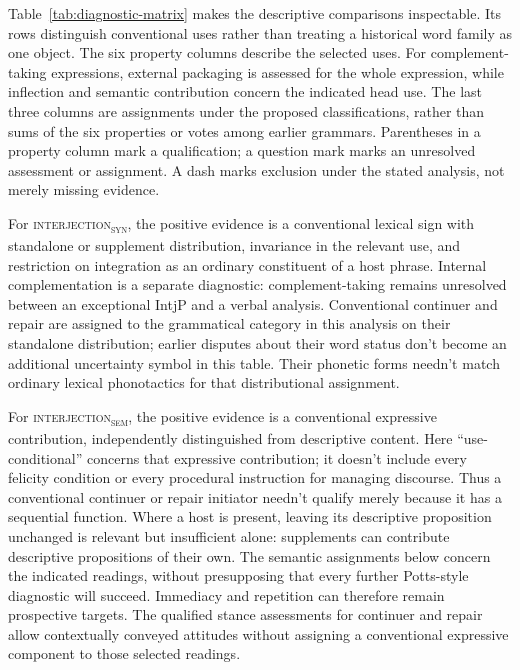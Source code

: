 \documentclass[12pt]{article}
\newcommand{\intj}[1]{\textsc{interjection\textsubscript{#1}}}
\begin{document}
Table~\ref{tab:diagnostic-matrix} makes the descriptive comparisons inspectable. Its rows distinguish conventional uses rather than treating a historical word family as one object. The six property columns describe the selected uses. For complement-taking expressions, external packaging is assessed for the whole expression, while inflection and semantic contribution concern the indicated head use. The last three columns are assignments under the proposed classifications, rather than sums of the six properties or votes among earlier grammars. Parentheses in a property column mark a qualification; a question mark marks an unresolved assessment or assignment. A dash marks exclusion under the stated analysis, not merely missing evidence.

For \intj{syn}, the positive evidence is a conventional lexical sign with standalone or supplement distribution, invariance in the relevant use, and restriction on integration as an ordinary constituent of a host phrase. Internal complementation is a separate diagnostic: complement-taking  remains unresolved between an exceptional IntjP and a verbal analysis. Conventional continuer  and repair  are assigned to the grammatical category in this analysis on their standalone distribution; earlier disputes about their word status don't become an additional uncertainty symbol in this table. Their phonetic forms needn't match ordinary lexical phonotactics for that distributional assignment.

For \intj{sem}, the positive evidence is a conventional expressive contribution, independently distinguished from descriptive content. Here \enquote{use-conditional} concerns that expressive contribution; it doesn't include every felicity condition or every procedural instruction for managing discourse. Thus a conventional continuer or repair initiator needn't qualify merely because it has a sequential function. Where a host is present, leaving its descriptive proposition unchanged is relevant but insufficient alone: supplements can contribute descriptive propositions of their own. The semantic assignments below concern the indicated readings, without presupposing that every further Potts-style diagnostic will succeed. Immediacy and repetition can therefore remain prospective targets. The qualified stance assessments for continuer  and repair  allow contextually conveyed attitudes without assigning a conventional expressive component to those selected readings.
\end{document}
